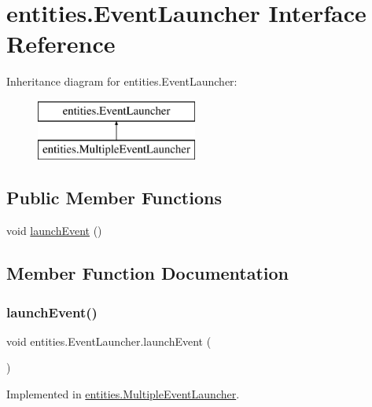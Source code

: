 \hypertarget{interfaceentities_1_1_event_launcher}{}\section{entities.\+Event\+Launcher Interface Reference}
\label{interfaceentities_1_1_event_launcher}
Inheritance diagram for entities.\+Event\+Launcher\+:\begin{figure}[H]
\begin{center}
\leavevmode
\includegraphics[height=2.000000cm]{interfaceentities_1_1_event_launcher}
\end{center}
\end{figure}
\subsection*{Public Member Functions}
\begin{DoxyCompactItemize}
\item 
void \mbox{\hyperlink{interfaceentities_1_1_event_launcher_a4aa8692d30404ff21b04dfc688e8efe0}{launch\+Event}} ()
\end{DoxyCompactItemize}


\subsection{Member Function Documentation}
\mbox{\label{interfaceentities_1_1_event_launcher_a4aa8692d30404ff21b04dfc688e8efe0}} 
\subsubsection{\texorpdfstring{launch\+Event()}{launchEvent()}}
{\footnotesize\ttfamily void entities.\+Event\+Launcher.\+launch\+Event (\begin{DoxyParamCaption}{ }\end{DoxyParamCaption})}



Implemented in \mbox{\hyperlink{classentities_1_1_multiple_event_launcher_a04d341ee9976ef057ab55b74ae99e6db}{entities.\+Multiple\+Event\+Launcher}}.

